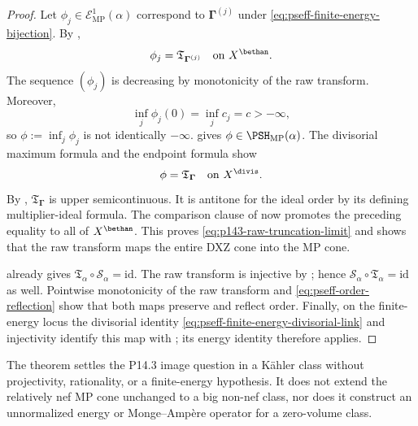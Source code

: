 \begin{proof}
Let \(\phi_j\in\mathcal E^1_{\mathrm{MP}}(\alpha)\) correspond to
\(\boldsymbol\Gamma^{(j)}\) under
\eqref{eq:pseff-finite-energy-bijection}.  By
,
\[
                    \phi_j
                    =\mathfrak T_{\boldsymbol\Gamma^{(j)}}
                    \quad\text{on }X^{\bethan}.
\]
The sequence \((\phi_j)\) is decreasing by monotonicity of the raw
transform.  Moreover,
\[
                    \inf_j\phi_j(0)=\inf_jc_j=c> -\infty,
\]
so \(\phi:=\inf_j\phi_j\) is not identically \(-\infty\).
 gives
\(\phi\in\PSH_{\mathrm{MP}}(\alpha)\).  The divisorial maximum formula
and the endpoint formula show
\[
                    \phi=\mathfrak T_{\boldsymbol\Gamma}
                    \quad\text{on }X^{\divis}.
\]
By
,
\(\mathfrak T_{\boldsymbol\Gamma}\) is upper semicontinuous.  It is
antitone for the ideal order by its defining multiplier-ideal formula.
The comparison clause of
 now promotes the preceding
equality to all of \(X^{\bethan}\).  This proves
\eqref{eq:p143-raw-truncation-limit} and shows that the raw transform maps
the entire DXZ cone into the MP cone.

 already gives
\(\mathfrak T_\alpha\circ\mathcal S_\alpha=\mathrm{id}\).  The raw
transform is injective by
; hence
\(\mathcal S_\alpha\circ\mathfrak T_\alpha=\mathrm{id}\) as well.
Pointwise monotonicity of the raw transform and
\eqref{eq:pseff-order-reflection} show that both maps preserve and reflect
order.  Finally, on the finite-energy locus the divisorial identity
\eqref{eq:pseff-finite-energy-divisorial-link} and injectivity identify
this map with ; its energy
identity therefore applies.
\end{proof}

\begin{remark}\label{rem:p143-full-kahler-scope}
The theorem settles the P14.3 image question in a K\"ahler class without
projectivity, rationality, or a finite-energy hypothesis.
It does not extend the relatively nef MP cone unchanged to a big non-nef
class, nor does it construct an unnormalized energy or Monge--Amp\`ere
operator for a zero-volume class.
\end{remark}

